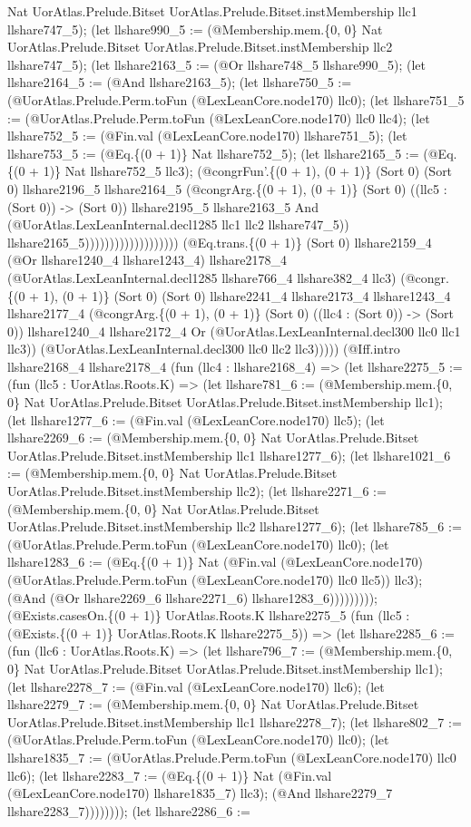 \documentclass[11pt]{article}
\begin{document}
Nat UorAtlas.Prelude.Bitset UorAtlas.Prelude.Bitset.instMembership llc1 llshare747\_5); (let llshare990\_5 := (@Membership.mem.\{0, 0\} Nat UorAtlas.Prelude.Bitset UorAtlas.Prelude.Bitset.instMembership llc2 llshare747\_5); (let llshare2163\_5 := (@Or llshare748\_5 llshare990\_5); (let llshare2164\_5 := (@And llshare2163\_5); (let llshare750\_5 := (@UorAtlas.Prelude.Perm.toFun (@LexLeanCore.node170) llc0); (let llshare751\_5 := (@UorAtlas.Prelude.Perm.toFun (@LexLeanCore.node170) llc0 llc4); (let llshare752\_5 := (@Fin.val (@LexLeanCore.node170) llshare751\_5); (let llshare753\_5 := (@Eq.\{(0 + 1)\} Nat llshare752\_5); (let llshare2165\_5 := (@Eq.\{(0 + 1)\} Nat llshare752\_5 llc3); (@congrFun'.\{(0 + 1), (0 + 1)\} (Sort 0) (Sort 0) llshare2196\_5 llshare2164\_5 (@congrArg.\{(0 + 1), (0 + 1)\} (Sort 0) ((llc5 : (Sort 0)) -> (Sort 0)) llshare2195\_5 llshare2163\_5 And (@UorAtlas.LexLeanInternal.decl1285 llc1 llc2 llshare747\_5)) llshare2165\_5))))))))))))))))))) (@Eq.trans.\{(0 + 1)\} (Sort 0) llshare2159\_4 (@Or llshare1240\_4 llshare1243\_4) llshare2178\_4 (@UorAtlas.LexLeanInternal.decl1285 llshare766\_4 llshare382\_4 llc3) (@congr.\{(0 + 1), (0 + 1)\} (Sort 0) (Sort 0) llshare2241\_4 llshare2173\_4 llshare1243\_4 llshare2177\_4 (@congrArg.\{(0 + 1), (0 + 1)\} (Sort 0) ((llc4 : (Sort 0)) -> (Sort 0)) llshare1240\_4 llshare2172\_4 Or (@UorAtlas.LexLeanInternal.decl300 llc0 llc1 llc3)) (@UorAtlas.LexLeanInternal.decl300 llc0 llc2 llc3))))) (@Iff.intro llshare2168\_4 llshare2178\_4 (fun (llc4 : llshare2168\_4) => (let llshare2275\_5 := (fun (llc5 : UorAtlas.Roots.K) => (let llshare781\_6 := (@Membership.mem.\{0, 0\} Nat UorAtlas.Prelude.Bitset UorAtlas.Prelude.Bitset.instMembership llc1); (let llshare1277\_6 := (@Fin.val (@LexLeanCore.node170) llc5); (let llshare2269\_6 := (@Membership.mem.\{0, 0\} Nat UorAtlas.Prelude.Bitset UorAtlas.Prelude.Bitset.instMembership llc1 llshare1277\_6); (let llshare1021\_6 := (@Membership.mem.\{0, 0\} Nat UorAtlas.Prelude.Bitset UorAtlas.Prelude.Bitset.instMembership llc2); (let llshare2271\_6 := (@Membership.mem.\{0, 0\} Nat UorAtlas.Prelude.Bitset UorAtlas.Prelude.Bitset.instMembership llc2 llshare1277\_6); (let llshare785\_6 := (@UorAtlas.Prelude.Perm.toFun (@LexLeanCore.node170) llc0); (let llshare1283\_6 := (@Eq.\{(0 + 1)\} Nat (@Fin.val (@LexLeanCore.node170) (@UorAtlas.Prelude.Perm.toFun (@LexLeanCore.node170) llc0 llc5)) llc3); (@And (@Or llshare2269\_6 llshare2271\_6) llshare1283\_6))))))))); (@Exists.casesOn.\{(0 + 1)\} UorAtlas.Roots.K llshare2275\_5 (fun (llc5 : (@Exists.\{(0 + 1)\} UorAtlas.Roots.K llshare2275\_5)) => (let llshare2285\_6 := (fun (llc6 : UorAtlas.Roots.K) => (let llshare796\_7 := (@Membership.mem.\{0, 0\} Nat UorAtlas.Prelude.Bitset UorAtlas.Prelude.Bitset.instMembership llc1); (let llshare2278\_7 := (@Fin.val (@LexLeanCore.node170) llc6); (let llshare2279\_7 := (@Membership.mem.\{0, 0\} Nat UorAtlas.Prelude.Bitset UorAtlas.Prelude.Bitset.instMembership llc1 llshare2278\_7); (let llshare802\_7 := (@UorAtlas.Prelude.Perm.toFun (@LexLeanCore.node170) llc0); (let llshare1835\_7 := (@UorAtlas.Prelude.Perm.toFun (@LexLeanCore.node170) llc0 llc6); (let llshare2283\_7 := (@Eq.\{(0 + 1)\} Nat (@Fin.val (@LexLeanCore.node170) llshare1835\_7) llc3); (@And llshare2279\_7 llshare2283\_7)))))))); (let llshare2286\_6 := 
\end{document}

